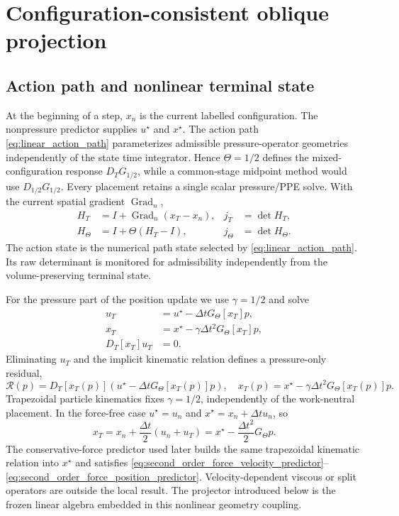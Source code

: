 \documentclass[11pt]{article}
\theoremstyle{plain}
\theoremstyle{definition}
\theoremstyle{remark}
\newcommand{\Grad}{\operatorname{Grad}}
\newcommand{\dt}{\Delta t}
\newcommand{\Th}{\Theta}
\begin{document}
\section{Configuration-consistent oblique projection}
\label{sec:ccop_analysis}

\subsection{Action path and nonlinear terminal state}

At the beginning of a step, $x_n$ is the current labelled configuration.  The
nonpressure predictor supplies $u^\star$ and $x^\star$.  The action path
\eqref{eq:linear_action_path} parameterizes admissible pressure-operator
geometries independently of the state time integrator.  Hence $\Th=1/2$ defines the
mixed-configuration response $D_TG_{1/2}$, while a common-stage midpoint
method would use $D_{1/2}G_{1/2}$.  Every placement retains a single scalar
pressure/PPE solve.  With the current spatial gradient $\Grad_n$,
\begin{align}
 H_T&=I+\Grad_n(x_T-x_n), & j_T&=\det H_T,\label{eq:relative_terminal_F}\\
 H_\Th&=I+\Th(H_T-I), & j_\Th&=\det H_\Th.
 \label{eq:relative_action_F}
\end{align}
The action state is the numerical path state selected by
\eqref{eq:linear_action_path}.  Its raw determinant is monitored for
admissibility independently from the volume-preserving terminal state.

For the pressure part of the position update we use $\gamma=1/2$ and solve
\begin{align}
 u_T&=u^\star-\dt G_\Th[x_T]p,\label{eq:nonlinear_velocity}\\
 x_T&=x^\star-\gamma\dt^2G_\Th[x_T]p,\label{eq:nonlinear_position}\\
 D_T[x_T]u_T&=0.\label{eq:nonlinear_terminal_constraint}
\end{align}
Eliminating $u_T$ and the implicit kinematic relation defines a pressure-only
residual,
\begin{equation}
 \mathcal R(p)=D_T[x_T(p)]
 \left(u^\star-\dt G_\Th[x_T(p)]p\right),
 \quad
 x_T(p)=x^\star-\gamma\dt^2G_\Th[x_T(p)]p.
 \label{eq:reduced_nonlinear_residual}
\end{equation}
Trapezoidal particle kinematics fixes $\gamma=1/2$, independently of the
work-neutral placement.  In the force-free case
$u^\star=u_n$ and $x^\star=x_n+\dt u_n$, so
\begin{equation}
 x_T=x_n+\frac{\dt}{2}(u_n+u_T)
     =x^\star-\frac{\dt^2}{2}G_\Th p.
 \label{eq:gamma_trapezoidal_origin}
\end{equation}
The conservative-force predictor used later builds the same trapezoidal
kinematic relation into $x^\star$ and satisfies
\eqref{eq:second_order_force_velocity_predictor}--
\eqref{eq:second_order_force_position_predictor}.  Velocity-dependent viscous
or split operators are outside the local result.  The projector introduced
below is the frozen linear algebra embedded in this nonlinear geometry
coupling.
\end{document}
